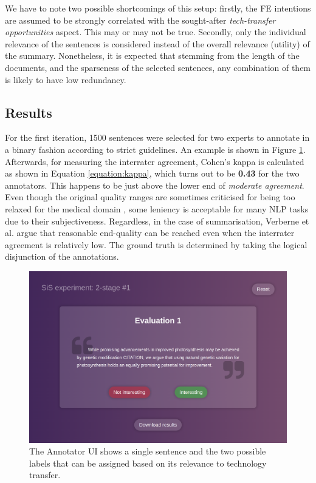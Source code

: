 We have to note two possible shortcomings of this setup: firstly, the FE intentions are assumed to be strongly correlated with the sought-after \textit{tech-transfer opportunities} aspect. This may or may not be true. Secondly, only the individual relevance of the sentences is considered instead of the overall relevance (utility) of the summary. Nonetheless, it is expected that stemming from the length of the documents, and the sparseness of the selected sentences, any combination of them is likely to have low redundancy.

\subsection{Results}

For the first iteration, 1500 sentences were selected for two experts to annotate in a binary fashion according to strict guidelines. An example is shown in Figure \ref{fig:annotator}. Afterwards, for measuring the interrater agreement, Cohen's kappa \cite{cohen1960coefficient} is calculated as shown in Equation \ref{equation:kappa}, which turns out to be \textbf{0.43} for the two annotators. This happens to be just above the lower end of \textit{moderate agreement}. Even though the original quality ranges are sometimes criticised for being too relaxed for the medical domain \cite{mchugh2012interrater}, some leniency is acceptable for many NLP tasks due to their subjectiveness. Regardless, in the case of summarisation, Verberne et al. \cite{verberne2018creating} argue that reasonable end-quality can be reached even when the interrater agreement is relatively low. The ground truth is determined by taking the logical disjunction of the annotations.

\begin{figure}
    \centering
    \includegraphics[width=0.75\linewidth]{figures/annotator.png}
    \captionsetup{width=.9\linewidth}
    \caption{The Annotator UI shows a single sentence and the two possible labels that can be assigned based on its relevance to technology transfer.}
    \label{fig:annotator}
\end{figure}

